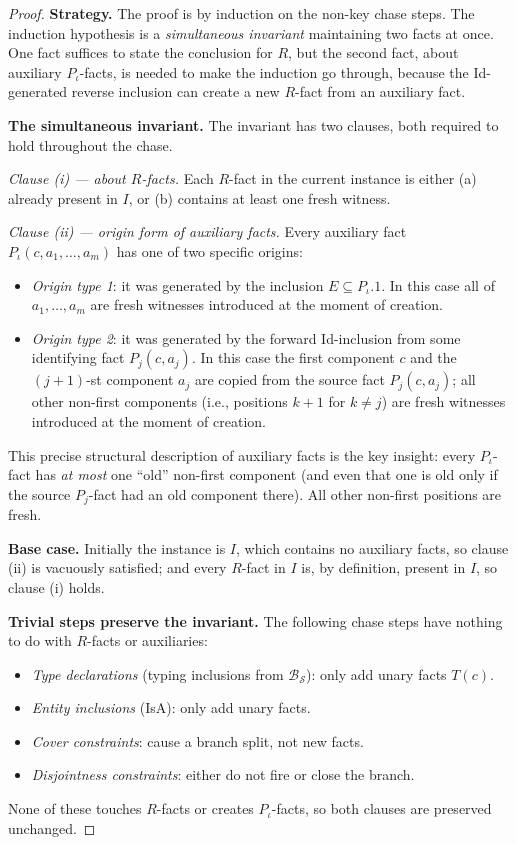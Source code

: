 \documentclass[10pt]{article}
\begin{document}
\begin{proof}

\smallskip\noindent\textbf{Strategy.}
The proof is by induction on the non-key chase steps.  The induction
hypothesis is a \emph{simultaneous invariant} maintaining two facts at
once.  One fact suffices to state the conclusion for \(R\), but the
second fact, about auxiliary \(P_\iota\)-facts, is needed to make the
induction go through, because the Id-generated reverse inclusion can
create a new \(R\)-fact from an auxiliary fact.

\smallskip\noindent\textbf{The simultaneous invariant.}
The invariant has two clauses, both required to hold throughout the
chase.

\emph{Clause (i) --- about \(R\)-facts.}
Each \(R\)-fact in the current instance is either (a) already present
in \(I\), or (b) contains at least one fresh witness.

\emph{Clause (ii) --- origin form of auxiliary facts.}
Every auxiliary fact \(P_\iota(c,a_1,\ldots,a_m)\) has one of two
specific origins:
\begin{itemize}
\item \emph{Origin type 1}: it was generated by the inclusion
\(E\subseteq P_\iota.1\).  In this case all of \(a_1,\ldots,a_m\) are
fresh witnesses introduced at the moment of creation.
\item \emph{Origin type 2}: it was generated by the forward
Id-inclusion from some identifying fact \(P_j(c,a_j)\).  In this case
the first component \(c\) and the \((j+1)\)-st component \(a_j\) are
copied from the source fact \(P_j(c,a_j)\); all other non-first
components (i.e., positions \(k+1\) for \(k\neq j\)) are fresh witnesses
introduced at the moment of creation.
\end{itemize}

This precise structural description of auxiliary facts is the key
insight: every \(P_\iota\)-fact has \emph{at most} one ``old''
non-first component (and even that one is old only if the source
\(P_j\)-fact had an old component there).  All other non-first
positions are fresh.

\smallskip\noindent\textbf{Base case.}
Initially the instance is \(I\), which contains no auxiliary facts, so
clause (ii) is vacuously satisfied; and every \(R\)-fact in \(I\) is,
by definition, present in \(I\), so clause (i) holds.

\smallskip\noindent\textbf{Trivial steps preserve the invariant.}
The following chase steps have nothing to do with \(R\)-facts or
auxiliaries:
\begin{itemize}
\item \emph{Type declarations} (typing inclusions from
\(\mathcal B_{\mathcal S}\)): only add unary facts \(T(c)\).
\item \emph{Entity inclusions} (IsA): only add unary facts.
\item \emph{Cover constraints}: cause a branch split, not new facts.
\item \emph{Disjointness constraints}: either do not fire or close the
branch.
\end{itemize}
None of these touches \(R\)-facts or creates \(P_\iota\)-facts, so both
clauses are preserved unchanged.


\end{proof}
\end{document}

